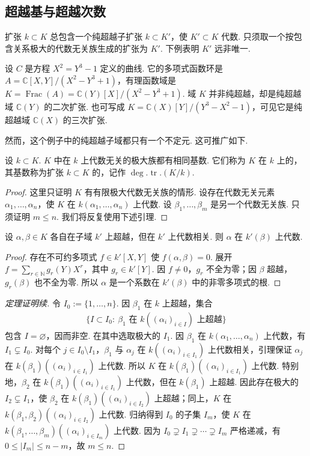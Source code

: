 \subsection{超越基与超越次数}\label{sec:galois-2-1-6}
扩张 $k\subset K$ 总包含一个纯超越子扩张 $k\subset K'$，使 $K'\subset K$ 代数. 只须取一个按包含关系极大的代数无关族生成的扩张为 $K'$. 下例表明 $K'$ 远非唯一.
\begin{example*}
设 $C$ 是方程 $X^2=Y^3-1$ 定义的曲线. 它的多项式函数环是 $A=\mathbb C[X,Y]/(X^2-Y^3+1)$，有理函数域是 $K=\operatorname{Frac}(A)=\mathbb C(Y)[X]/(X^2-Y^3+1)$. 域 $K$ 并非纯超越，却是纯超越域 $\mathbb C(Y)$ 的二次扩张. 也可写成 $K=\mathbb C(X)[Y]/(Y^3-X^2-1)$，可见它是纯超越域 $\mathbb C(X)$ 的三次扩张.
\end{example*}
然而，这个例子中的纯超越子域都只有一个不定元. 这可推广如下.
\begin{theorem*}
设 $k\subset K$. $K$ 中在 $k$ 上代数无关的极大族都有相同基数. 它们称为 $K$ 在 $k$ 上的，其基数称为扩张 $k\subset K$ 的，记作 $\deg.\operatorname{tr}.(K/k)$.
\end{theorem*}
\begin{proof}
这里只证明 $K$ 有有限极大代数无关族的情形. 设存在代数无关元素 $\alpha_1,\ldots,\alpha_n$，使 $K$ 在 $k(\alpha_1,\ldots,\alpha_n)$ 上代数. 设 $\beta_1,\ldots,\beta_m$ 是另一个代数无关族. 只须证明 $m\le n$. 我们将反复使用下述引理.
\end{proof}
\begin{lemma*}
设 $\alpha,\beta\in K$ 各自在子域 $k'$ 上超越，但在 $k'$ 上代数相关. 则 $\alpha$ 在 $k'(\beta)$ 上代数.
\end{lemma*}
\begin{proof}
存在不可约多项式 $f\in k'[X,Y]$ 使 $f(\alpha,\beta)=0$. 展开 $f=\sum_{r\in\mathbb N}g_r(Y)X^r$，其中 $g_r\in k'[Y]$. 因 $f\ne0$，$g_r$ 不全为零；因 $\beta$ 超越，$g_r(\beta)$ 也不全为零. 所以 $\alpha$ 是一个系数在 $k'(\beta)$ 中的非零多项式的根.
\end{proof}
\begin{proof}[定理证明续]
令 $I_0:=\{1,\ldots,n\}$. 因 $\beta_1$ 在 $k$ 上超越，集合
\begin{align*}
\{I\subset I_0:\ \beta_1\text{ 在 }k((\alpha_i)_{i\in I})\text{ 上超越}\}
\end{align*}
包含 $I=\varnothing$，因而非空. 在其中选取极大的 $I_1$. 因 $\beta_1$ 在 $k(\alpha_1,\ldots,\alpha_n)$ 上代数，有 $I_1\subsetneq I_0$. 对每个 $j\in I_0\setminus I_1$，$\beta_1$ 与 $\alpha_j$ 在 $k((\alpha_i)_{i\in I_1})$ 上代数相关，引理保证 $\alpha_j$ 在 $k(\beta_1)((\alpha_i)_{i\in I_1})$ 上代数. 所以 $K$ 在 $k(\beta_1)((\alpha_i)_{i\in I_1})$ 上代数.
特别地，$\beta_2$ 在 $k(\beta_1)((\alpha_i)_{i\in I_1})$ 上代数，但在 $k(\beta_1)$ 上超越. 因此存在极大的 $I_2\subsetneq I_1$，使 $\beta_2$ 在 $k(\beta_1)((\alpha_i)_{i\in I_2})$ 上超越；同上，$K$ 在 $k(\beta_1,\beta_2)((\alpha_i)_{i\in I_2})$ 上代数. 归纳得到 $I_0$ 的子集 $I_m$，使 $K$ 在 $k(\beta_1,\ldots,\beta_m)((\alpha_i)_{i\in I_m})$ 上代数. 因为 $I_0\supsetneq I_1\supsetneq\cdots\supsetneq I_m$ 严格递减，有 $0\le|I_m|\le n-m$，故 $m\le n$.
\end{proof}
